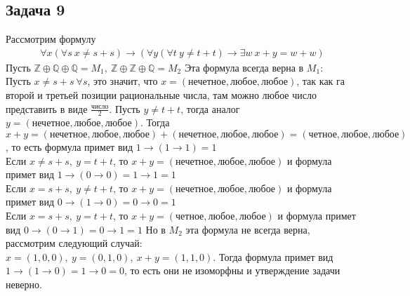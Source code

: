 \subsection*{Задача 9}
	Рассмотрим формулу
	\begin{gather*}
		\forall x (\forall s\ x \ne s + s) \to (\forall y (\forall t\ y \ne t + t) \to \exists w\ x + y = w + w)
	\end{gather*}
	Пусть $\mathbb{Z} \oplus \mathbb{Q} \oplus \mathbb{Q} = M_1,\ \mathbb{Z} \oplus \mathbb{Z} \oplus \mathbb{Q} = M_2$
	\vskip 0.1in
	Эта формула всегда верна в $M_1$:\\
	Пусть $x \ne s + s\ \forall s$, это значит, что $x = (\text{нечетное}, \text{любое}, \text{любое})$, так как га второй и третьей позиции рациональные числа, там можно любое число представить в виде $\frac{\text{число}}{2}$. Пусть $y \ne t+t$, тогда аналог $y = (\text{нечетное}, \text{любое}, \text{любое})$. Тогда $x + y = (\text{нечетное}, \text{любое}, \text{любое}) + (\text{нечетное}, \text{любое}, \text{любое}) = (\text{четное}, \text{любое}, \text{любое})$, то есть формула примет вид $1 \to (1 \to 1) = 1$\\
	Если $x \ne s + s,\ y = t + t$, то $x + y = (\text{нечетное}, \text{любое}, \text{любое})$ и формула примет вид $1 \to (0 \to 0) = 1 \to 1 = 1$\\
	Если $x = s + s,\ y \ne t + t$, то $x + y = (\text{нечетное}, \text{любое}, \text{любое})$ и формула примет вид $0 \to (1 \to 0) = 0 \to 0 = 1$\\
	Если $x = s + s,\ y = t + t$, то $x + y = (\text{четное}, \text{любое}, \text{любое})$ и формула примет вид $0 \to (0 \to 1) = 0 \to 1 = 1$
	\vskip 0.1in
	Но в $M_2$ эта формула не всегда верна, рассмотрим следующий случай:\\
	$x = (1,0,0),\ y = (0,1,0),\ x + y = (1,1,0)$. Тогда формула примет вид $1 \to (1 \to 0) = 1 \to 0 = 0$, то есть они не изоморфны и утверждение задачи неверно.